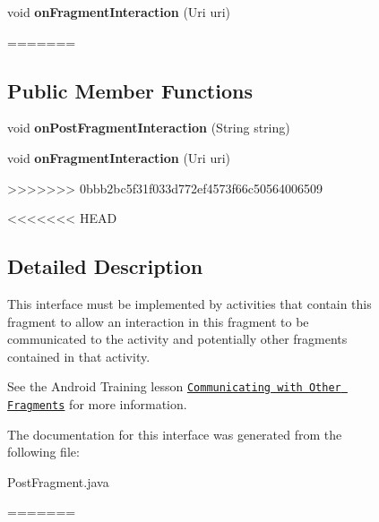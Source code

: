 \begin{figure}[H]
\begin{DoxyCompactItemize}
\item 
\hypertarget{interfacecom_1_1example_1_1sel_1_1lostfound_1_1PostFragment_1_1OnFragmentInteractionListener_a1fd1f1bbc8912c5d04c708869645dc8e}{void {\bfseries on\-Fragment\-Interaction} (Uri uri)}\label{interfacecom_1_1example_1_1sel_1_1lostfound_1_1PostFragment_1_1OnFragmentInteractionListener_a1fd1f1bbc8912c5d04c708869645dc8e}
=======
\subsection*{\-Public \-Member \-Functions}
\begin{DoxyCompactItemize}
\item 
\hypertarget{interfacecom_1_1example_1_1sel_1_1lostfound_1_1PostFragment_1_1OnFragmentInteractionListener_a9ca2bef2b5bd8c3f86dd3e8f14045b17}{void {\bfseries on\-Post\-Fragment\-Interaction} (\-String string)}\label{interfacecom_1_1example_1_1sel_1_1lostfound_1_1PostFragment_1_1OnFragmentInteractionListener_a9ca2bef2b5bd8c3f86dd3e8f14045b17}

\item 
\hypertarget{interfacecom_1_1example_1_1sel_1_1lostfound_1_1PostFragment_1_1OnFragmentInteractionListener_a1fd1f1bbc8912c5d04c708869645dc8e}{void {\bfseries on\-Fragment\-Interaction} (\-Uri uri)}\label{interfacecom_1_1example_1_1sel_1_1lostfound_1_1PostFragment_1_1OnFragmentInteractionListener_a1fd1f1bbc8912c5d04c708869645dc8e}
>>>>>>> 0bbb2bc5f31f033d772ef4573f66c50564006509

\end{DoxyCompactItemize}


<<<<<<< HEAD
\subsection{Detailed Description}
This interface must be implemented by activities that contain this fragment to allow an interaction in this fragment to be communicated to the activity and potentially other fragments contained in that activity. 

See the Android Training lesson \href{http://developer.android.com/training/basics/fragments/communicating.html}{\tt Communicating with Other Fragments} for more information. 

The documentation for this interface was generated from the following file\-:\begin{DoxyCompactItemize}
\item 
Post\-Fragment.\-java\end{DoxyCompactItemize}
=======

\end{DoxyCompactItemize}
\end{figure}
